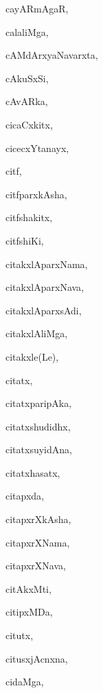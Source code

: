 \begin{multicols}{3}
{\noindent
{cayARmAgaR}, \pageref{cayARmAgaR}

\noindent
{calaliMga}, \pageref{calaliMga}

\noindent
{cAMdArxyaNavarxta}, \pageref{cAMdArxyaNavarxta}

\noindent
{cAkuSxSi}, \pageref{cAkuSxSi}

\noindent
{cAvARka}, \pageref{cAvARka}

\noindent
{cicaCxkitx}, \pageref{cicaCxkitx}

\noindent
{cicecxYtanayx}, \pageref{cicecxYtanayx}

\noindent
{citf}, \pageref{citf}

\noindent
{citfparxkAsha}, \pageref{citfparxkAsha}

\noindent
{citfshakitx}, \pageref{citfshakitx}

\noindent
{citfshiKi}, \pageref{citfshiKi}

\noindent
{citakxlAparxNama}, \pageref{citakxlAparxNama}

\noindent
{citakxlAparxNava}, \pageref{citakxlAparxNava}

\noindent
{citakxlAparxsAdi}, \pageref{citakxlAparxsAdi}

\noindent
{citakxlAliMga}, \pageref{citakxlAliMga}

\noindent
{citakxle(Le)}, \pageref{citakxle(Le)}

\noindent
{citatx}, \pageref{citatx}

\noindent
{citatxparipAka}, \pageref{citatxparipAka}

\noindent
{citatxshudidhx}, \pageref{citatxshudidhx}

\noindent
{citatxsuyidAna}, \pageref{citatxsuyidAna}

\noindent
{citatxhasatx}, \pageref{citatxhasatx}

\noindent
{citapxda}, \pageref{citapxda}

\noindent
{citapxrXkAsha}, \pageref{citapxrXkAsha}

\noindent
{citapxrXNama}, \pageref{citapxrXNama}

\noindent
{citapxrXNava}, \pageref{citapxrXNava}

\noindent
{citAkxMti}, \pageref{citAkxMti}

\noindent
{citipxMDa}, \pageref{citipxMDa}

\noindent
{citutx}, \pageref{citutx}

\noindent
{citusxjAcnxna}, \pageref{citusxjAcnxna}

\noindent
{cidaMga}, \pageref{cidaMga}

}
\end{multicols}
